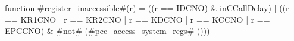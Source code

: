 function #\hyperref[zregisterzyinaccessible]{register\_inaccessible}#(r) =
  ((r == IDCNO) & inCCallDelay) |
  ((r == KR1CNO |
    r == KR2CNO |
    r == KDCNO  |
    r == KCCNO  |
    r == EPCCNO) & #\hyperref[znot]{not}# (#\hyperref[zpcczyaccesszysystemzyregs]{pcc\_access\_system\_regs}# ()))
